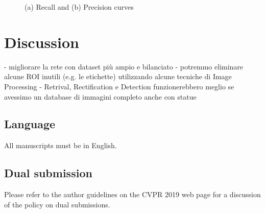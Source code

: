 \documentclass[10pt,twocolumn,letterpaper]{article}
\begin{document}
\begin{figure}
    \centering
    \caption{(a) Recall  and (b) Precision curves}
    \label{fig:foobar}
\end{figure}

\section{Discussion}

- migliorare la rete con dataset più ampio e bilanciato
- potremmo eliminare alcune ROI inutili (e.g. le etichette) utilizzando alcune tecniche di Image Processing
- Retrival, Rectification e Detection funzionerebbero meglio se avessimo un database di immagini completo anche con statue



\subsection{Language}

All manuscripts must be in English.

\subsection{Dual submission}

Please refer to the author guidelines on the CVPR 2019 web page for a
discussion of the policy on dual submissions.
\end{document}
